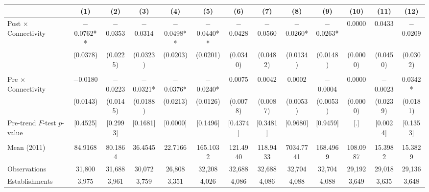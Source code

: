 \documentclass[12pt,letterpaper]{article}
\begin{document}
\begin{table}[]
\begin{threeparttable}
\begin{tabular}{lcccccccccccc}
 & (1) & (2) & (3) & (4) & (5) & (6) & (7) & (8) & (9) & (10) & (11) & (12) \\
\midrule
Post $\times$ Connectivity & $-$0.0762** & $-$0.0353 & $-$0.0314 & $-$0.0498** & $-$0.0440** & $-$0.0428 & $-$0.0560 & $-$0.0260* & $-$0.0263* & 0.0000 & 0.0433 & $-$0.0209 \\
  & (0.0378) & (0.0225) & (0.0323) & (0.0203) & (0.0201) & (0.0340) & (0.0482) & (0.0134) & (0.0148) & (0.0000) & (0.0450) & (0.0302) \\
  &  &  &  &  &  &  &  &  &  &  &  & \\
Pre $\times$ Connectivity & $-$0.0180 & $-$0.0223 & $-$0.0321* & $-$0.0376* & $-$0.0240* & 0.0075 & 0.0042 & 0.0002 & $-$0.0004 & 0.0000 & $-$0.0023 & 0.0342* \\
  & (0.0143) & (0.0145) & (0.0188) & (0.0213) & (0.0126) & (0.0078) & (0.0087) & (0.0053) & (0.0053) & (0.0000) & (0.0239) & (0.0181) \\
Pre-trend $F$-test $p$-value & [0.4525] & [0.2993] & [0.1681] & [0.0000] & [0.1496] & [0.4374] & [0.3481] & [0.9680] & [0.9459] & [.] & [0.0024] & [0.1353] \\
  &  &  &  &  &  &  &  &  &  &  &  & \\
Mean (2011) & 84.9168 & 80.1864 & 36.4545 & 22.7166 & 165.1032 & 121.4940 & 118.9433 & 7034.7741 & 168.4969 & 108.0987 & 15.3982 & 15.3829 \\
Observations & 31{,}800 & 31{,}688 & 30{,}072 & 26{,}808 & 32{,}208 & 32{,}688 & 32{,}688 & 32{,}704 & 32{,}704 & 29{,}192 & 29{,}018 & 29{,}136 \\
Establishments & 3{,}975 & 3{,}961 & 3{,}759 & 3{,}351 & 4{,}026 & 4{,}086 & 4{,}086 & 4{,}088 & 4{,}088 & 3{,}649 & 3{,}635 & 3{,}648 \\
\bottomrule
\end{tabular}
\scriptsize
\begin{tablenotes}

\end{tablenotes}
\end{threeparttable}
\end{table}
\end{document}
